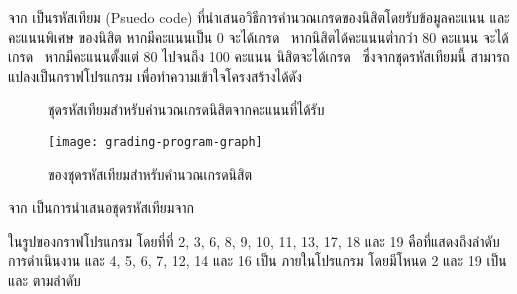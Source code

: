 จาก เป็นรหัสเทียม (Psuedo code) ที่นำเสนอวิธีการคำนวณเกรดของนิสิตโดยรับข้อมูลคะแนน  
และคะแนนพิเศษ  ของนิสิต หากมีคะแนนเป็น 0 จะได้เกรด \ หากนิสิตได้คะแนนต่ำกว่า 80 คะแนน 
จะได้เกรด \ หากมีคะแนนตั้งแต่ 80 ไปจนถึง 100 คะแนน นิสิตจะได้เกรด \ ซึ่งจากชุดรหัสเทียมนี้ 
สามารถแปลงเป็นกราฟโปรแกรม เพื่อทำความเข้าใจโครงสร้างได้ดัง{ 

\begin{figure}[ht!]
    \begin{algorithm}[H]
        \begin{algorithmic}[1]

                \ENDIF
            \ENDIF


            \ENDIF

        \end{algorithmic}
    \end{algorithm}
    \caption{ชุดรหัสเทียมสำหรับคำนวณเกรดนิสิตจากคะแนนที่ได้รับ}
    \label{fig:pseudocodeGrading}
\end{figure}


\begin{figure}[ht!]
    \centering
    \texttt{[image: grading-program-graph]}
    \caption{{\cfg}ของชุดรหัสเทียมสำหรับคำนวณเกรดนิสิต}
    \label{fig:programGraph}
\end{figure}

จาก{} เป็นการนำเสนอชุดรหัสเทียมจาก{ ในรูปของกราฟโปรแกรม 
โดยที่{\Node}ที่ 2, 3, 6, 8, 9, 10, 11, 13, 17, 18 และ 19 คือ{\Node}ที่แสดงถึงลำดับการดำเนินงาน 
และ{\Node} 4, 5, 6, 7, 12, 14 และ 16 เป็น{\FirstTimeDefine{\PredicateNode}{\PredicateNodeEN}} ภายในโปรแกรม 
โดยมีโหนด 2 และ 19 เป็น{\sourcenode} และ{\sinknode} ตามลำดับ 

}}
